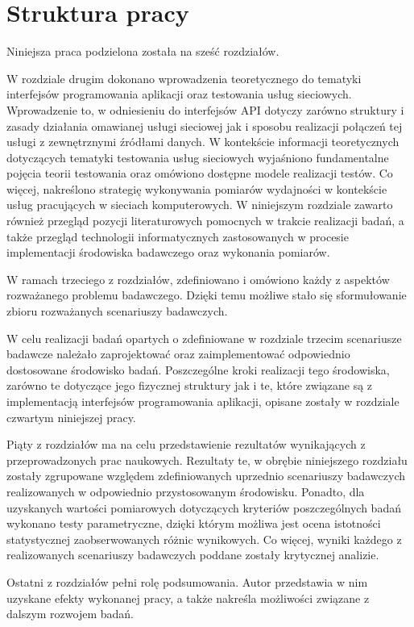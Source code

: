 \section{Struktura pracy}
Niniejsza praca podzielona została na sześć rozdziałów.

W rozdziale drugim dokonano wprowadzenia teoretycznego do tematyki interfejsów programowania aplikacji oraz testowania usług sieciowych. Wprowadzenie to, w odniesieniu do interfejsów API dotyczy zarówno struktury i zasady działania omawianej usługi sieciowej jak i sposobu realizacji połączeń tej usługi z zewnętrznymi źródłami danych. W kontekście informacji teoretycznych dotyczących tematyki testowania usług sieciowych wyjaśniono fundamentalne pojęcia teorii testowania oraz omówiono dostępne modele realizacji testów. Co więcej, nakreślono strategię wykonywania pomiarów wydajności w kontekście usług pracujących w sieciach komputerowych. W niniejszym rozdziale zawarto również przegląd pozycji literaturowych pomocnych w trakcie realizacji badań, a także przegląd technologii informatycznych zastosowanych w procesie implementacji środowiska badawczego oraz wykonania pomiarów.

W ramach trzeciego z rozdziałów, zdefiniowano i omówiono każdy z aspektów rozważanego problemu badawczego. Dzięki temu możliwe stało się sformułowanie zbioru rozważanych scenariuszy badawczych.

W celu realizacji badań opartych o zdefiniowane w rozdziale trzecim scenariusze badawcze należało zaprojektować oraz zaimplementować odpowiednio dostosowane środowisko badań. Poszczególne kroki realizacji tego środowiska, zarówno te dotyczące jego fizycznej struktury jak i te, które związane są z implementacją interfejsów programowania aplikacji, opisane zostały w rozdziale czwartym niniejszej pracy. 

Piąty z rozdziałów ma na celu przedstawienie rezultatów wynikających z przeprowadzonych prac naukowych. Rezultaty te, w obrębie niniejszego rozdziału zostały zgrupowane względem zdefiniowanych uprzednio scenariuszy badawczych realizowanych w odpowiednio przystosowanym środowisku. Ponadto, dla uzyskanych wartości pomiarowych dotyczących kryteriów poszczególnych badań wykonano testy parametryczne, dzięki którym możliwa jest ocena istotności statystycznej zaobserwowanych różnic wynikowych. Co więcej, wyniki każdego z realizowanych scenariuszy badawczych poddane zostały krytycznej analizie.

Ostatni z rozdziałów pełni rolę podsumowania. Autor przedstawia w nim uzyskane efekty wykonanej pracy, a także nakreśla możliwości związane z dalszym rozwojem badań.